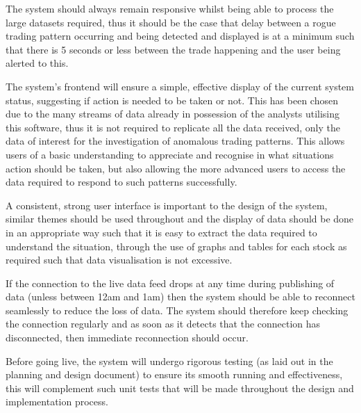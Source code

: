 \documentclass[11pt, oneside, a4paper]{article}
\begin{document}
The system should always remain responsive whilst being able to process the large datasets required, thus it
should be the case that delay between a rogue trading pattern occurring and being detected and displayed is at
a minimum such that there is 5 seconds or less between the trade happening and the user being alerted to this.

The system’s frontend will ensure a simple, effective display of the current system status, suggesting if action
is needed to be taken or not. This has been chosen due to the many streams of data already in possession of the
analysts utilising this software, thus it is not required to replicate all the data received, only the data of
interest for the investigation of anomalous trading patterns. This allows users of a basic understanding to
appreciate and recognise in what situations action should be taken, but also allowing the more advanced users to
access the data required to respond to such patterns successfully.

A consistent, strong user interface is important to the design of the system, similar themes should be used
throughout and the display of data should be done in an appropriate way such that it is easy to extract the
data required to understand the situation, through the use of graphs and tables for each stock as required such
that data visualisation is not excessive.

If the connection to the live data feed drops at any time during publishing of data (unless between 12am and
1am) then the system should be able to reconnect seamlessly to reduce the loss of data. The system should
therefore keep checking the connection regularly and as soon as it detects that the connection has disconnected,
then immediate reconnection should occur.

Before going live, the system will undergo rigorous testing (as laid out in the planning and design document)
to ensure its smooth running and effectiveness, this will complement such unit tests that will be made throughout
the design and implementation process.
\end{document}
